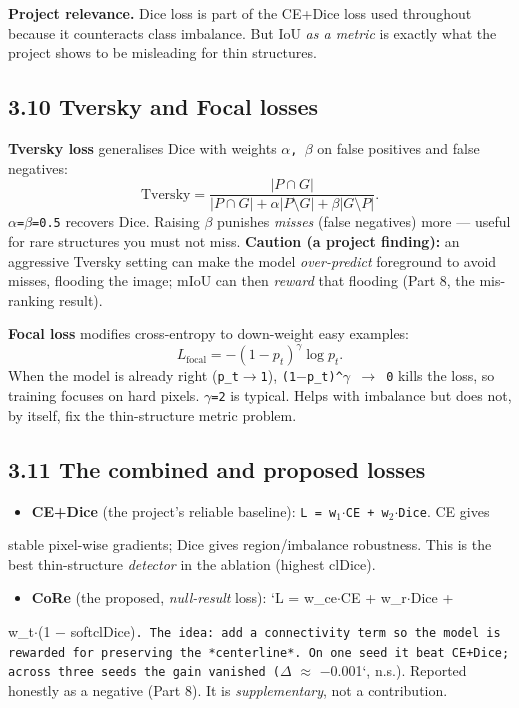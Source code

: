 \documentclass[11pt]{article}
\begin{document}
\textbf{Project relevance.} Dice loss is part of the CE+Dice loss used throughout because it counteracts class imbalance. But IoU \textit{as a metric} is exactly what the project shows to be misleading for thin structures.

\subsection*{3.10 Tversky and Focal losses}

\textbf{Tversky loss} generalises Dice with weights \texttt{$\alpha$, $\beta$} on false positives and false negatives: \[\text{Tversky} = \frac{|P\cap G|}{|P\cap G| + \alpha|P\setminus G| + \beta|G\setminus P|}.\] \texttt{$\alpha$=$\beta$=0.5} recovers Dice. Raising \texttt{$\beta$} punishes \textit{misses} (false negatives) more --- useful for rare structures you must not miss. \textbf{Caution (a project finding):} an aggressive Tversky setting can make the model \textit{over-predict} foreground to avoid misses, flooding the image; mIoU can then \textit{reward} that flooding (Part 8, the mis-ranking result).

\textbf{Focal loss} modifies cross-entropy to down-weight easy examples: \[L_\text{focal} = -(1-p_t)^\gamma \log p_t.\] When the model is already right (\texttt{p\_t$\rightarrow$1}), \texttt{(1$-$p\_t)\textasciicircum{}$\gamma$ $\rightarrow$ 0} kills the loss, so training focuses on hard pixels. \texttt{$\gamma$=2} is typical. Helps with imbalance but does not, by itself, fix the thin-structure metric problem.

\subsection*{3.11 The combined and proposed losses}

\begin{itemize}\setlength{\itemsep}{1pt}
\item \textbf{CE+Dice} (the project's reliable baseline): \texttt{L = w$_{1}$$\cdot$CE + w$_{2}$$\cdot$Dice}. CE gives
\end{itemize}
  stable pixel-wise gradients; Dice gives region/imbalance robustness. This is the   best thin-structure \textit{detector} in the ablation (highest clDice).

\begin{itemize}\setlength{\itemsep}{1pt}
\item \textbf{CoRe} (the proposed, \textit{null-result} loss): `L = w\_ce$\cdot$CE + w\_r$\cdot$Dice +
\end{itemize}
  w\_t$\cdot$(1 $-$ softclDice)\texttt{. The idea: add a connectivity term so the model is rewarded   for preserving the *centerline*. On one seed it beat CE+Dice; across three seeds the   gain vanished (}$\Delta$ $\approx$ $-$0.001`, n.s.). Reported honestly as a negative (Part 8). It is   \textit{supplementary}, not a contribution.
\end{document}
